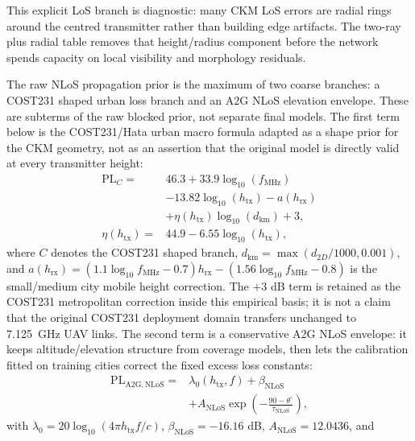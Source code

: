 \documentclass[journal]{IEEEtran}
\begin{document}
This explicit LoS branch is diagnostic: many CKM LoS errors are radial rings
around the centred transmitter rather than building edge artifacts. The
two-ray plus radial table removes that height/radius component before the
network spends capacity on local visibility and morphology residuals.

The raw NLoS propagation prior is the maximum of two coarse branches: a
COST231 shaped urban loss branch and an A2G NLoS elevation envelope. These are
subterms of the raw blocked prior, not separate final models. The first term
below is the COST231/Hata urban macro formula adapted as a shape prior for the
CKM geometry, not as an assertion that the original model is directly valid at
every transmitter height:
\begin{equation}
\begin{aligned}
\mathrm{PL}_{C}
={}&46.3+33.9\log_{10}(f_{\mathrm{MHz}})
\\
&-13.82\log_{10}(h_{\mathrm{tx}})
-a(h_{\mathrm{rx}})\\
&+\eta(h_{\mathrm{tx}})\log_{10}(d_{\mathrm{km}})+3,\\
\eta(h_{\mathrm{tx}})
={}&44.9-6.55\log_{10}(h_{\mathrm{tx}}),
\end{aligned}
\label{eq:cost-paper}
\end{equation}
where \(C\) denotes the COST231 shaped branch,
\(d_{\mathrm{km}}=\max(d_{2D}/1000,0.001)\), and
\(a(h_{\mathrm{rx}})
=(1.1\log_{10}f_{\mathrm{MHz}}-0.7)h_{\mathrm{rx}}
-(1.56\log_{10}f_{\mathrm{MHz}}-0.8)\)
is the small/medium city mobile height correction. The \(+3\) dB term is
retained as the COST231 metropolitan correction inside this empirical basis; it
is not a claim that the original COST231 deployment domain transfers unchanged
to \SI{7.125}{GHz} UAV links. The second term is a conservative A2G NLoS
envelope: it keeps altitude/elevation structure from coverage models, then lets
the calibration fitted on training cities correct the fixed excess loss
constants:
\begin{equation}
\begin{aligned}
\mathrm{PL}_{\mathrm{A2G,NLoS}}
={}&\lambda_0(h_{\mathrm{tx}},f)+\beta_{\mathrm{NLoS}}\\
&+A_{\mathrm{NLoS}}
\exp\!\left(-\frac{90-\theta^\circ}{\tau_{\mathrm{NLoS}}}\right),
\end{aligned}
\label{eq:a2g-paper}
\end{equation}
with \(\lambda_0=20\log_{10}(4\pi h_{\mathrm{tx}}f/c)\),
\(\beta_{\mathrm{NLoS}}=-16.16\) dB,
\(A_{\mathrm{NLoS}}=12.0436\), and
\end{document}
